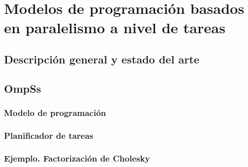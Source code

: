 \cleardoublepage


\chapter{Modelos de programación basados en paralelismo a nivel de tareas}
\label{ch:chapter3}

\section{Descripción general y estado del arte}

\section{OmpSs}

\subsection{Modelo de programación}

\subsection{Planificador de tareas}

\subsection{Ejemplo. Factorización de Cholesky}


